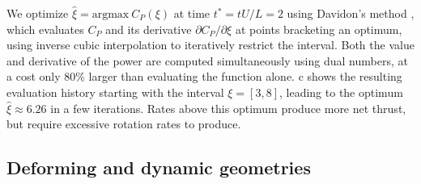 \documentclass[10pt,a4paper]{article}
\begin{document}
We optimize $\hat\xi=\text{argmax}\ C_P(\xi)$ at time $t^*=tU/L=2$ using Davidon's method \citep{davidon1991}, which evaluates $C_P$ and its derivative $\partial C_P/\partial \xi$ at points bracketing an optimum, using inverse cubic interpolation to iteratively restrict the interval. Both the value and derivative of the power are computed simultaneously using dual numbers, at a cost only 80\% larger than evaluating the function alone. c shows the resulting evaluation history starting with the interval $\xi=[3,8]$, leading to the optimum $\hat\xi\approx 6.26$ in a few iterations. Rates above this optimum produce more net thrust, but require excessive rotation rates to produce.

\subsection{Deforming and dynamic geometries}
\end{document}
